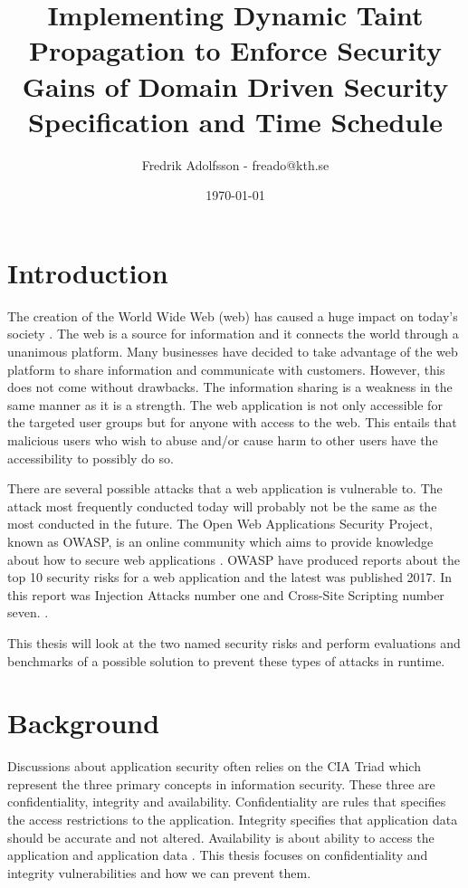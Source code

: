 \documentclass{../kththesis}
\title{Implementing Dynamic Taint Propagation to Enforce Security Gains of Domain Driven Security \\
					\large Specification and Time Schedule}
\author{Fredrik Adolfsson - freado@kth.se}
\date{\today}
\begin{document}
	
	\frontmatter
	
	
	
	\titlepage
	
	
	\tableofcontents
	
	
	\mainmatter
	
	
	
	\chapter{Introduction}
	The creation of the World Wide Web (web) has caused a huge impact on today’s society \parencite{www}. The web is a source for information and it connects the world through a unanimous platform. Many businesses have decided to take advantage of the web platform to share information and communicate with customers. However, this does not come without drawbacks. The information sharing is a weakness in the same manner as it is a strength. The web application is not only accessible for the targeted user groups but for anyone with access to the web. This entails that malicious users who wish to abuse and/or cause harm to other users have the accessibility to possibly do so. 
	
	There are several possible attacks that a web application is vulnerable to. The attack most frequently conducted today will probably not be the same as the most conducted in the future. The Open Web Applications Security Project, known as OWASP, is an online community which aims to provide knowledge about how to secure web applications \parencite{OpenWebApplicationSecurityProject}. OWASP have produced reports about the top 10 security risks for a web application and the latest was published 2017. In this report was Injection Attacks number one and Cross-Site Scripting number seven. \parencite{OWASP2017, OpenWebApplicationSecurityProject, CrossMichael2007Dgtw}.
	
	This thesis will look at the two named security risks and perform evaluations and benchmarks of a possible solution to prevent these types of attacks in runtime. 
	
	
	
	\chapter{Background}
	Discussions about application security often relies on the CIA Triad which represent the three primary concepts in information security. These three are confidentiality, integrity and availability. Confidentiality are rules that specifies the access restrictions to the application. Integrity specifies that application data should be accurate and not altered. Availability is about ability to access the application and application data \parencite{2014C1-W}. This thesis focuses on confidentiality and integrity vulnerabilities and how we can prevent them.
	
\end{document}

